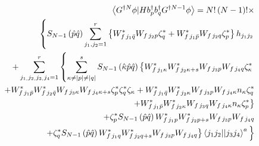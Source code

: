 \documentclass{article}
\begin{document}
\begin{eqnarray}
&&\left\langle G^{\dagger N}\phi |Hb_{p}^{\dagger }b_{q}^{\dagger
}G^{\dagger N-1}\phi \right\rangle =N!\left( N-1\right) !\times  \notag \\
&&\left\{ S_{N-1}\left( \hat{p}\hat{q}\right)
\sum_{j_{1},j_{2}=1}^{r}\left\{ W_{f\,j_{1}\bar{q}}^{\ast
}W_{f\,j_{2}p}\zeta _{q}^{\ast }+W_{f\,j_{1}\bar{p}}^{\ast
}W_{f\,j_{2}q}\zeta _{p}^{\ast }\right\} h_{j_{1}j_{2}}\right.  \notag \\
&&+\sum_{j_{1,}j_{2,}j_{3,}j_{4}=1}^{r}\left\{ \sum_{\kappa \neq \left|
p\right| \neq \left| q\right| }^{s}S_{N-1}\left( \hat{\kappa}\hat{p}\hat{q}%
\right) \left\{ W_{f\,j_{1}\kappa }^{\ast }W_{f\,j_{2}\kappa +s}^{\ast
}W_{f\,j_{3}p}W_{f\,j_{4}q}\zeta _{\kappa }^{\ast }\right. \right.  \notag \\
&&\quad \qquad \quad +W_{f\,j_{1}\bar{p}}^{\ast }W_{f\,j_{2}\bar{q}}^{\ast
}W_{f\,j_{3}\kappa }W_{f\,j_{4}\kappa +s}\zeta _{p}^{\ast }\zeta _{q}^{\ast
}\zeta _{\kappa }+W_{f\,j_{1}\bar{q}}^{\ast }W_{f\,j_{2}\kappa }^{\ast
}W_{f\,j_{3}p}W_{f\,j_{4}\kappa }n_{\kappa }\zeta _{q}^{\ast }  \notag \\
&&\qquad \qquad \qquad \qquad \qquad \qquad \qquad \qquad \qquad \left.
+W_{f\,j_{1}\bar{p}}^{\ast }W_{f\,j_{2}\kappa }^{\ast
}W_{f\,j_{3}q}W_{f\,j_{4}\kappa }n_{\kappa }\zeta _{p}^{\ast }\right\} 
\notag \\
&&+\zeta _{p}^{\ast }S_{N-1}\left( \hat{p}\hat{q}\right) W_{f\,j_{1}p}^{\ast
}W_{f\,j_{2}p+s}^{\ast }W_{f\,j_{3}p}W_{f\,j_{4}q}  \notag \\
&&\qquad \qquad \qquad \left. \left. +\zeta _{q}^{\ast }S_{N-1}\left( \hat{p}%
\hat{q}\right) W_{f\,j_{1}q}^{\ast }W_{f\,j_{2}q+s}^{\ast
}W_{f\,j_{3}p}W_{f\,j_{4}q}\right\} \left\langle
j_{1}j_{2}||j_{3}j_{4}\right\rangle ^{a}\underset{}{\overset{}{}}\right\}
\end{eqnarray}
\end{document}
